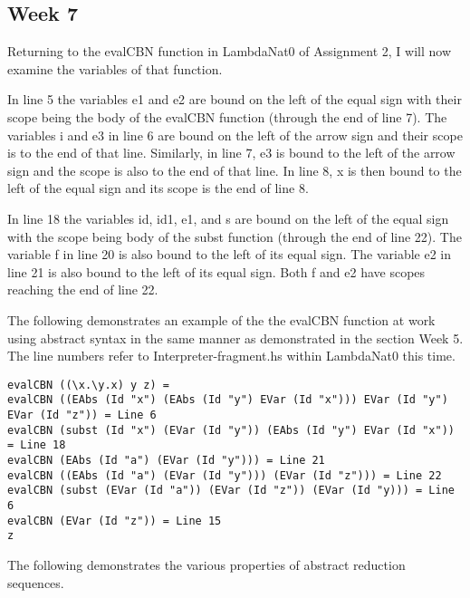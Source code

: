 \documentclass{article}
\theoremstyle{theorem}
\theoremstyle{definition}
\theoremstyle{remark}
\begin{document}
\subsection{Week 7}

Returning to the evalCBN function in LambdaNat0 of Assignment 2, I will now examine the variables of that function.

\medskip\noindent
In line 5 the variables e1 and e2 are bound on the left of the equal sign with their scope being the body of the evalCBN function (through the end of line 7). The variables i and e3 in line 6 are bound on the left of the arrow sign and their scope is to the end of that line. Similarly, in line 7, e3 is bound to the left of the arrow sign and the scope is also to the end of that line. In line 8, x is then bound to the left of the equal sign and its scope is the end of line 8.

\medskip\noindent
In line 18 the variables id, id1, e1, and s are bound on the left of the equal sign with the scope being body of the subst function (through the end of line 22). The variable f in line 20 is also bound to the left of its equal sign. The variable e2 in line 21 is also bound to the left of its equal sign. Both f and e2 have scopes reaching the end of line 22.

\medskip\noindent
The following demonstrates an example of the the evalCBN function at work using abstract syntax in the same manner as demonstrated in the section Week 5. The line numbers refer to Interpreter-fragment.hs within LambdaNat0 this time.

\begin{lstlisting}
evalCBN ((\x.\y.x) y z) =
evalCBN ((EAbs (Id "x") (EAbs (Id "y") EVar (Id "x"))) EVar (Id "y") EVar (Id "z")) = Line 6
evalCBN (subst (Id "x") (EVar (Id "y")) (EAbs (Id "y") EVar (Id "x")) = Line 18
evalCBN (EAbs (Id "a") (EVar (Id "y"))) = Line 21
evalCBN ((EAbs (Id "a") (EVar (Id "y"))) (EVar (Id "z"))) = Line 22
evalCBN (subst (EVar (Id "a")) (EVar (Id "z")) (EVar (Id "y))) = Line 6
evalCBN (EVar (Id "z")) = Line 15
z
\end{lstlisting}
%
The following demonstrates the various properties of abstract reduction sequences.
\end{document}
